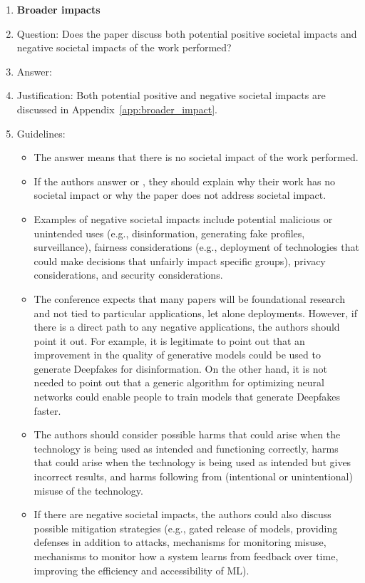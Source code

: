\begin{enumerate}
\item {\bf Broader impacts}
    \item[] Question: Does the paper discuss both potential positive societal impacts and negative societal impacts of the work performed?
    \item[] Answer: \answerYes{}
    \item[] Justification: Both potential positive and negative societal impacts are discussed in Appendix~\ref{app:broader_impact}.
    \item[] Guidelines:
    \begin{itemize}
        \item The answer \answerNA{} means that there is no societal impact of the work performed.
        \item If the authors answer \answerNA{} or \answerNo, they should explain why their work has no societal impact or why the paper does not address societal impact.
        \item Examples of negative societal impacts include potential malicious or unintended uses (e.g., disinformation, generating fake profiles, surveillance), fairness considerations (e.g., deployment of technologies that could make decisions that unfairly impact specific groups), privacy considerations, and security considerations.
        \item The conference expects that many papers will be foundational research and not tied to particular applications, let alone deployments. However, if there is a direct path to any negative applications, the authors should point it out. For example, it is legitimate to point out that an improvement in the quality of generative models could be used to generate Deepfakes for disinformation. On the other hand, it is not needed to point out that a generic algorithm for optimizing neural networks could enable people to train models that generate Deepfakes faster.
        \item The authors should consider possible harms that could arise when the technology is being used as intended and functioning correctly, harms that could arise when the technology is being used as intended but gives incorrect results, and harms following from (intentional or unintentional) misuse of the technology.
        \item If there are negative societal impacts, the authors could also discuss possible mitigation strategies (e.g., gated release of models, providing defenses in addition to attacks, mechanisms for monitoring misuse, mechanisms to monitor how a system learns from feedback over time, improving the efficiency and accessibility of ML).
    \end{itemize}


\end{enumerate}
